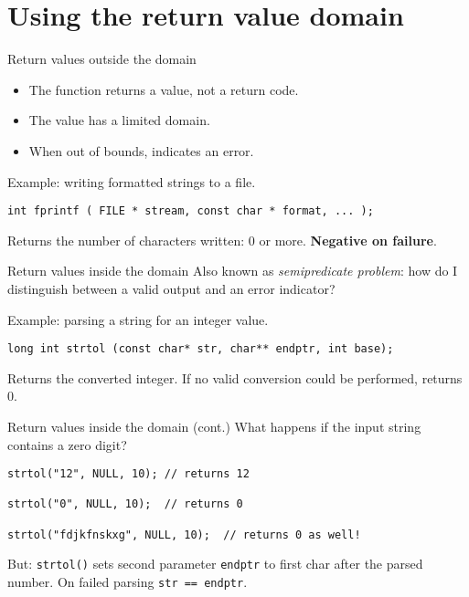 \documentclass[aspectratio=169,14pt]{beamer}
\begin{document}
\section{Using the return value domain}
\begin{frame}[fragile]{Return values outside the domain}

\begin{itemize}
    \item The function returns a value, not a return code.
    \item The value has a limited domain.
    \item When out of bounds, indicates an error.
\end{itemize}

Example: writing formatted strings to a file.

\begin{lstlisting}[style=cstyle]
int fprintf ( FILE * stream, const char * format, ... );
\end{lstlisting}

Returns the number of characters written: 0 or more. \textbf{Negative on failure}. 
\end{frame}


\begin{frame}[fragile]{Return values inside the domain}
Also known as \textit{semipredicate problem}: how do I distinguish between a valid output and an error indicator?

Example: parsing a string for an integer value.

\begin{lstlisting}[style=cstyle]
long int strtol (const char* str, char** endptr, int base);
\end{lstlisting}

Returns the converted integer. If no valid conversion could be performed, returns 0.
\end{frame}

\begin{frame}[fragile]{Return values inside the domain (cont.)}
What happens if the input string contains a zero digit?

\begin{lstlisting}[style=cstyle]
strtol("12", NULL, 10); // returns 12

strtol("0", NULL, 10);  // returns 0

strtol("fdjkfnskxg", NULL, 10);  // returns 0 as well!
\end{lstlisting}

But: \texttt{strtol()} sets second parameter \texttt{endptr} to first char after the parsed number. On failed parsing \texttt{str == endptr}.
\end{frame}
\end{document}
